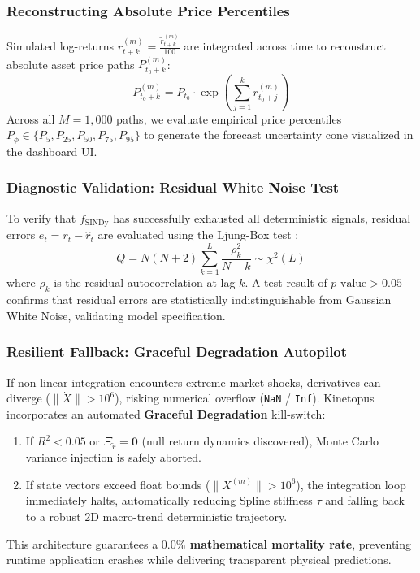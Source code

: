\documentclass[11pt,a4paper]{article}
\begin{document}
\subsubsection{Reconstructing Absolute Price Percentiles}
Simulated log-returns $r_{t+k}^{(m)} = \frac{\tilde{r}_{t+k}^{(m)}}{100}$ are integrated across time to reconstruct absolute asset price paths $P_{t_0 + k}^{(m)}$:
\begin{equation}
    P_{t_0 + k}^{(m)} = P_{t_0} \cdot \exp \left( \sum_{j=1}^{k} r_{t_0 + j}^{(m)} \right)
\end{equation}
Across all $M = 1,000$ paths, we evaluate empirical price percentiles $P_{\phi} \in \{P_5, P_{25}, P_{50}, P_{75}, P_{95}\}$ to generate the forecast uncertainty cone visualized in the dashboard UI.

\subsubsection{Diagnostic Validation: Residual White Noise Test}
To verify that $f_{\text{SINDy}}$ has successfully exhausted all deterministic signals, residual errors $e_t = r_t - \hat{r}_t$ are evaluated using the Ljung-Box test \cite{ljung1978measure}:
\begin{equation}
    Q = N(N+2) \sum_{k=1}^{L} \frac{\rho_k^2}{N-k} \sim \chi^2(L)
\end{equation}
where $\rho_k$ is the residual autocorrelation at lag $k$. A test result of $p\text{-value} > 0.05$ confirms that residual errors are statistically indistinguishable from Gaussian White Noise, validating model specification.

\subsubsection{Resilient Fallback: Graceful Degradation Autopilot}
If non-linear integration encounters extreme market shocks, derivatives can diverge ($\|\dot{X}\| > 10^6$), risking numerical overflow (\texttt{NaN} / \texttt{Inf}). Kinetopus incorporates an automated \textbf{Graceful Degradation} kill-switch:
\begin{enumerate}[leftmargin=1.5em]
    \item If $R^2 < 0.05$ or $\Xi_{\tilde{r}} = \mathbf{0}$ (null return dynamics discovered), Monte Carlo variance injection is safely aborted.
    \item If state vectors exceed float bounds ($\|X^{(m)}\| > 10^6$), the integration loop immediately halts, automatically reducing Spline stiffness $\tau$ and falling back to a robust 2D macro-trend deterministic trajectory.
\end{enumerate}
This architecture guarantees a \textbf{$0.0\%$ mathematical mortality rate}, preventing runtime application crashes while delivering transparent physical predictions.
\end{document}
